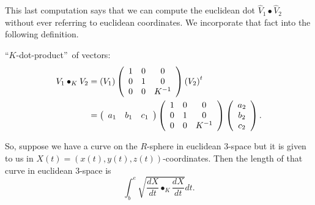 This last computation says that we can compute the euclidean dot $\hat{V}%
_{1}\bullet\hat{V}_{2}$ without ever referring to euclidean coordinates. We
incorporate that fact into the following definition.

\begin{definition}
\textquotedblleft$K$-dot-product\textquotedblright\ of vectors:%
\begin{align}
V_{1}\bullet_{K}V_{2}  &  =\left(  V_{1}\right)  \left(
\begin{array}
[c]{ccc}%
1 & 0 & 0\\
0 & 1 & 0\\
0 & 0 & K^{-1}%
\end{array}
\right)  \left(  V_{2}\right)  ^{t}\label{10}\\
&  =\left(
\begin{array}
[c]{ccc}%
a_{1} & b_{1} & c_{1}%
\end{array}
\right)  \left(
\begin{array}
[c]{ccc}%
1 & 0 & 0\\
0 & 1 & 0\\
0 & 0 & K^{-1}%
\end{array}
\right)  \left(
\begin{array}
[c]{c}%
a_{2}\\
b_{2}\\
c_{2}%
\end{array}
\right)  .\nonumber
\end{align}

\end{definition}

So, suppose we have a curve on the $R$-sphere in euclidean $3$-space but it is
given to us in $X\left(  t\right)  =\left(  x\left(  t\right)  ,y\left(
t\right)  ,z\left(  t\right)  \right)  $-coordinates. Then the length of that
curve in euclidean $3$-space is%
\[%
{\displaystyle\int\nolimits_{b}^{e}}
\sqrt{\frac{dX}{dt}\bullet_{K}\frac{dX}{dt}}dt.
\]


